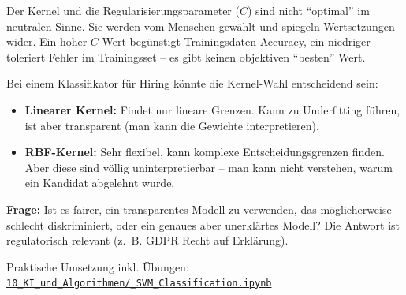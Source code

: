\begin{mydefinition}
Der Kernel und die Regularisierungsparameter ($C$) sind nicht \enquote{optimal} im neutralen Sinne. Sie werden vom Menschen gewählt und spiegeln Wertsetzungen wider. Ein hoher $C$-Wert begünstigt Trainingsdaten-Accuracy, ein niedriger toleriert Fehler im Trainingsset -- es gibt keinen objektiven \enquote{besten} Wert.
\end{mydefinition}

\begin{myexample}
Bei einem Klassifikator für Hiring könnte die Kernel-Wahl entscheidend sein:
\begin{itemize}
    \item \textbf{Linearer Kernel:} Findet nur lineare Grenzen. Kann zu Underfitting führen, ist aber transparent (man kann die Gewichte interpretieren).
    \item \textbf{RBF-Kernel:} Sehr flexibel, kann komplexe Entscheidungsgrenzen finden. Aber diese sind völlig uninterpretierbar -- man kann nicht verstehen, warum ein Kandidat abgelehnt wurde.
\end{itemize}
\textbf{Frage:} Ist es fairer, ein transparentes Modell zu verwenden, das möglicherweise schlecht diskriminiert, oder ein genaues aber unerklärtes Modell? Die Antwort ist regulatorisch relevant (z.~B. GDPR Recht auf Erklärung).
\end{myexample}

\begin{myremark}[Notebook]
Praktische Umsetzung inkl. Übungen:\newline
\href{\notebookurl}{\texttt{10\_KI\_und\_Algorithmen/\_SVM\_Classification.ipynb}}
\end{myremark}
